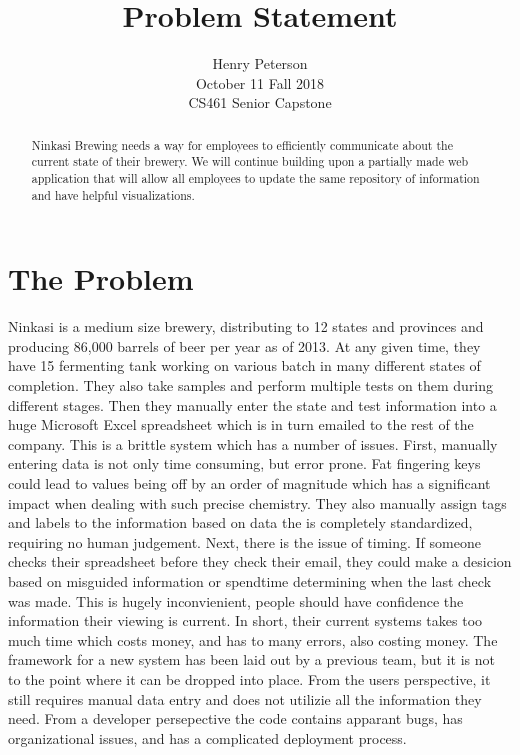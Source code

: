 \documentclass[draftclsnofoot,onecolumn,10pt]{IEEEtran}
\title{Problem Statement}
\author{Henry Peterson \\ October 11 Fall 2018 \\ CS461 Senior Capstone }
\begin{document}
	\maketitle

	\begin{abstract}
		Ninkasi Brewing needs a way for employees to efficiently communicate about the current state of their brewery. We will continue building upon a partially made web application that will allow all employees to update the same repository of information and have helpful visualizations.
	\end{abstract}
	\pagebreak

	\section*{The Problem}
		Ninkasi is a medium size brewery, distributing to 12 states and provinces and  producing 86,000 barrels of beer per year as of 2013. At any given time, they have 15 fermenting tank working on various batch in many different states of completion. They also take samples and perform multiple tests on them during different stages. Then they manually enter the state and test information into a huge Microsoft Excel spreadsheet which is in turn emailed to the rest of the company. This is a brittle system which has a number of issues. First, manually entering data is not only time consuming, but error prone. Fat fingering keys could lead to values being off by an order of magnitude which has a significant impact when dealing with such precise chemistry. They also manually assign tags and labels to the information based on data the is completely standardized, requiring no human judgement. Next, there is the issue of timing. If someone checks their spreadsheet before they check their email, they could make a desicion based on misguided information or spendtime determining when the last check was made. This is hugely inconvienient, people should have confidence the information their viewing is current. In short, their current systems takes too much time which costs money, and has to many errors, also costing money. The framework for a new system has been laid out by a previous team, but it is not to the point where it can be dropped into place. From the users perspective, it still requires manual data entry and does not utilizie all the information they need. From a developer persepective the code contains apparant bugs, has organizational issues, and has a complicated deployment process.
\end{document}
